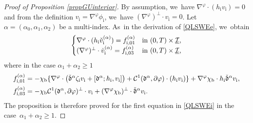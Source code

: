 \documentclass[10pt]{amsart}
\newcommand{\cI}{{\mathcal I}}
\newcommand{\ul}[1]{\underline{#1}}
\newcommand{\cmfalpha}{\check{\mathfrak{d}}^{\alpha}}
\theoremstyle{definition}
\begin{document}
\begin{proof}[Proof of Proposition \ref{propGUinterior}]
By assumption, we~have $\nabla^{\varphi}\cdot(h_\mathrm{i}v_\mathrm{i})=0$ and from the definition $v_\mathrm{i}=\nabla^\varphi \phi_\mathrm{i}$, we~have $(\nabla^\varphi)^\perp\cdot v_\mathrm{i}=0$.
Let $\alpha=(\alpha_0,\alpha_1,\alpha_2)$ be a multi-index. As~in the derivation of \eqref{QLSWEe}, we~obtain
\begin{equation}\label{preQLSWEi0}
\begin{cases}
\nabla^\varphi\cdot(h_\mathrm{i}\check{v}_\mathrm{i}^{(\alpha)}) = f_{{\rm i},01}^{(\alpha)} &\text{in } (0,T)\times\ul{\cI}, \\
(\nabla^\varphi)^\perp\cdot\check{v}_\mathrm{i}^{(\alpha)} = f_{{\rm i},03}^{(\alpha)} &\text{in } (0,T)\times\ul{\cI},
\end{cases}
\end{equation}
where in the case $\alpha_1+\alpha_2\geq1$
\begin{align}
\label{deffi01}
f_{{\rm i},01}^{(\alpha)}
&= -\chi_\mathrm{b}\{ \nabla^\varphi\cdot\bigl(\cmfalpha\zeta_\mathrm{i} v_\mathrm{i}
+ [\mathfrak{d}^\alpha;h_\mathrm{i},v_\mathrm{i}] \bigr)
+ {\mathcal C}^1(\mathfrak{d}^\alpha,\partial\varphi)\cdot(h_\mathrm{i}v_\mathrm{i}) \}
+ \nabla^\varphi\chi_\mathrm{b}\cdot h_\mathrm{i} \cmfalpha v_\mathrm{i} , \\
\label{deffi03}
f_{{\rm i},03}^{(\alpha)}
&= -\chi_\mathrm{b} {\mathcal C}^1(\mathfrak{d}^\alpha,\partial\varphi)^\perp\cdot v_\mathrm{i}
+ (\nabla^\varphi\chi_\mathrm{b})^\perp\cdot \cmfalpha v_\mathrm{i}.
\end{align}
The proposition is therefore proved for the first equation in \eqref{QLSWEi} in the case~\hbox{$\alpha_1\!+\!\alpha_2\!\geq\! 1$}.


\end{proof}
\end{document}
